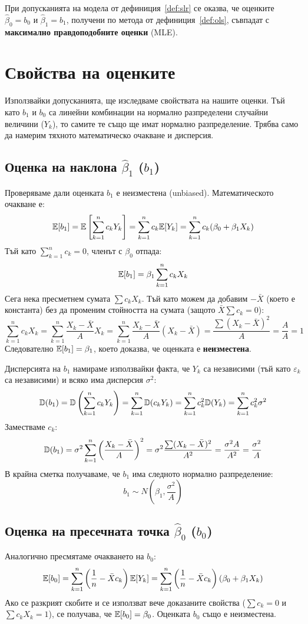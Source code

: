 При допусканията на модела от дефиниция~\ref{def:slr} се оказва, че оценките $\hat{\beta}_0 = b_0$ и $\hat{\beta}_1 = b_1$, получени по метода от дефиниция~\ref{def:ols}, съвпадат с \textbf{максимално правдоподобните оценки} (MLE).

\section{Свойства на оценките}

Използвайки допусканията, ще изследваме свойствата на нашите оценки. Тъй като $b_1$ и $b_0$ са линейни комбинации на нормално разпределени случайни величини ($Y_k$), то самите те също ще имат нормално разпределение. Трябва само да намерим тяхното математическо очакване и дисперсия.

\subsection{Оценка на наклона $\hat{\beta}_1$ ($b_1$)}
Проверяваме дали оценката $b_1$ е неизместена (unbiased). Математическото очакване е:
\[
\mathbb{E}[b_1] = \mathbb{E}\left[ \sum_{k=1}^n c_k Y_k \right] = \sum_{k=1}^n c_k \mathbb{E}[Y_k] = \sum_{k=1}^n c_k (\beta_0 + \beta_1 X_k)
\]
Тъй като $\sum_{k=1}^n c_k = 0$, членът с $\beta_0$ отпада:
\[
\mathbb{E}[b_1] = \beta_1 \sum_{k=1}^n c_k X_k
\]
Сега нека пресметнем сумата $\sum c_k X_k$. Тъй като можем да добавим $-\bar{X}$ (което е константа) без да променим стойността на сумата (защото $\bar{X} \sum c_k = 0$):
\[
\sum_{k=1}^n c_k X_k = \sum_{k=1}^n \frac{X_k - \bar{X}}{A} X_k = \sum_{k=1}^n \frac{X_k - \bar{X}}{A} (X_k - \bar{X}) = \frac{\sum (X_k - \bar{X})^2}{A} = \frac{A}{A} = 1
\]
Следователно $\mathbb{E}[b_1] = \beta_1$, което доказва, че оценката е \textbf{неизместена}.

Дисперсията на $b_1$ намираме използвайки факта, че $Y_k$ са независими (тъй като $\varepsilon_k$ са независими) и всяко има дисперсия $\sigma^2$:
\[
\mathbb{D}(b_1) = \mathbb{D}\left( \sum_{k=1}^n c_k Y_k \right) = \sum_{k=1}^n \mathbb{D}(c_k Y_k) = \sum_{k=1}^n c_k^2 \mathbb{D}(Y_k) = \sum_{k=1}^n c_k^2 \sigma^2
\]
Заместваме $c_k$:
\[
\mathbb{D}(b_1) = \sigma^2 \sum_{k=1}^n \left( \frac{X_k - \bar{X}}{A} \right)^2 = \sigma^2 \frac{\sum (X_k - \bar{X})^2}{A^2} = \frac{\sigma^2 A}{A^2} = \frac{\sigma^2}{A}
\]
В крайна сметка получаваме, че $b_1$ има следното нормално разпределение:
\[
b_1 \sim N\left(\beta_1, \frac{\sigma^2}{A}\right)
\]

\subsection{Оценка на пресечната точка $\hat{\beta}_0$ ($b_0$)}
Аналогично пресмятаме очакването на $b_0$:
\[
\mathbb{E}[b_0] = \sum_{k=1}^n \left( \frac{1}{n} - \bar{X} c_k \right) \mathbb{E}[Y_k] = \sum_{k=1}^n \left( \frac{1}{n} - \bar{X} c_k \right) (\beta_0 + \beta_1 X_k)
\]
Ако се разкрият скобите и се използват вече доказаните свойства ($\sum c_k = 0$ и $\sum c_k X_k = 1$), се получава, че $\mathbb{E}[b_0] = \beta_0$. Оценката $b_0$ също е неизместена.

